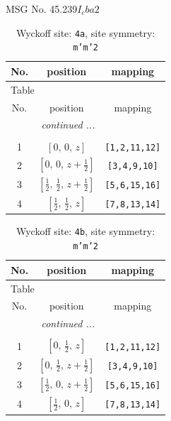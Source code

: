 \documentclass[fleqn,8pt]{jsarticle}
\begin{document}
\setcounter{MaxMatrixCols}{32}

\renewcommand{\tablename}{Table~}
\renewcommand{\figurename}{Figure~}
\begin{center}
\LARGE
MSG No. 45.239\quad$I_{c}ba2$
\end{center}
\renewcommand{\arraystretch}{1.2}
\begin{longtable}{ccc}
\caption{Wyckoff site: {\tt 4a}, site symmetry: {\tt m'm'2}}
 \\
 \hline \hline
No. & position & mapping \\ \hline \endfirsthead

\multicolumn{2}{l}{\tablename\ \thetable{}} \\
 \hline \hline
No. & position & mapping \\ \hline \endhead

 \hline \hline
\multicolumn{2}{r}{\footnotesize\it continued ...} \\ \endfoot

 \hline \hline
\multicolumn{2}{r}{} \\ \endlastfoot

1 & $\left[ 0,\, 0,\, z \right]$ & {\tt [1,2,11,12]} \\ \hline
2 & $\left[ 0,\, 0,\, z + \frac{1}{2} \right]$ & {\tt [3,4,9,10]} \\ \hline
3 & $\left[ \frac{1}{2},\, \frac{1}{2},\, z + \frac{1}{2} \right]$ & {\tt [5,6,15,16]} \\ \hline
4 & $\left[ \frac{1}{2},\, \frac{1}{2},\, z \right]$ & {\tt [7,8,13,14]} \\
\end{longtable}
\renewcommand{\arraystretch}{1.2}
\begin{longtable}{ccc}
\caption{Wyckoff site: {\tt 4b}, site symmetry: {\tt m'm'2}}
 \\
 \hline \hline
No. & position & mapping \\ \hline \endfirsthead

\multicolumn{2}{l}{\tablename\ \thetable{}} \\
 \hline \hline
No. & position & mapping \\ \hline \endhead

 \hline \hline
\multicolumn{2}{r}{\footnotesize\it continued ...} \\ \endfoot

 \hline \hline
\multicolumn{2}{r}{} \\ \endlastfoot

1 & $\left[ 0,\, \frac{1}{2},\, z \right]$ & {\tt [1,2,11,12]} \\ \hline
2 & $\left[ 0,\, \frac{1}{2},\, z + \frac{1}{2} \right]$ & {\tt [3,4,9,10]} \\ \hline
3 & $\left[ \frac{1}{2},\, 0,\, z + \frac{1}{2} \right]$ & {\tt [5,6,15,16]} \\ \hline
4 & $\left[ \frac{1}{2},\, 0,\, z \right]$ & {\tt [7,8,13,14]} \\
\end{longtable}
\end{document}
